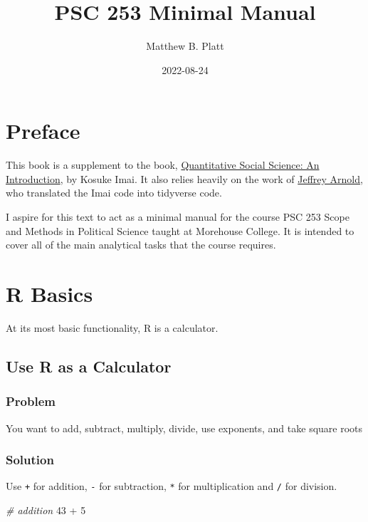 \documentclass[
]{book}
\title{PSC 253 Minimal Manual}
\author{Matthew B. Platt}
\date{2022-08-24}
\newenvironment{Shaded}{\begin{snugshade}}{\end{snugshade}}
\newcommand{\CommentTok}[1]{\textcolor[rgb]{0.56,0.35,0.01}{\textit{#1}}}
\newcommand{\DecValTok}[1]{\textcolor[rgb]{0.00,0.00,0.81}{#1}}
\newcommand{\SpecialCharTok}[1]{\textcolor[rgb]{0.00,0.00,0.00}{#1}}
\begin{document}
\maketitle

{
\setcounter{tocdepth}{1}
\tableofcontents
}
\hypertarget{preface}{%
\chapter*{Preface}\label{preface}}

This book is a supplement to the book, \href{http://qss.princeton.press/}{Quantitative Social Science: An Introduction}, by Kosuke Imai. It also relies heavily on the work of \href{https://jrnold.github.io/qss-tidy/}{Jeffrey Arnold}, who translated the Imai code into tidyverse code.

I aspire for this text to act as a minimal manual for the course PSC 253 Scope and Methods in Political Science taught at Morehouse College. It is intended to cover all of the main analytical tasks that the course requires.

\hypertarget{basic}{%
\chapter{R Basics}\label{basic}}

At its most basic functionality, R is a calculator.

\hypertarget{calculate}{%
\section{Use R as a Calculator}\label{calculate}}

\hypertarget{problem}{%
\subsection{Problem}\label{problem}}

You want to add, subtract, multiply, divide, use exponents, and take square roots

\hypertarget{solution}{%
\subsection{Solution}\label{solution}}

Use \texttt{+} for addition, \texttt{-} for subtraction, \texttt{*} for multiplication and \texttt{/} for division.

\begin{Shaded}
\begin{Highlighting}[]
\CommentTok{\# addition}
\DecValTok{43} \SpecialCharTok{+} \DecValTok{5}
\end{Highlighting}
\end{Shaded}
\end{document}

